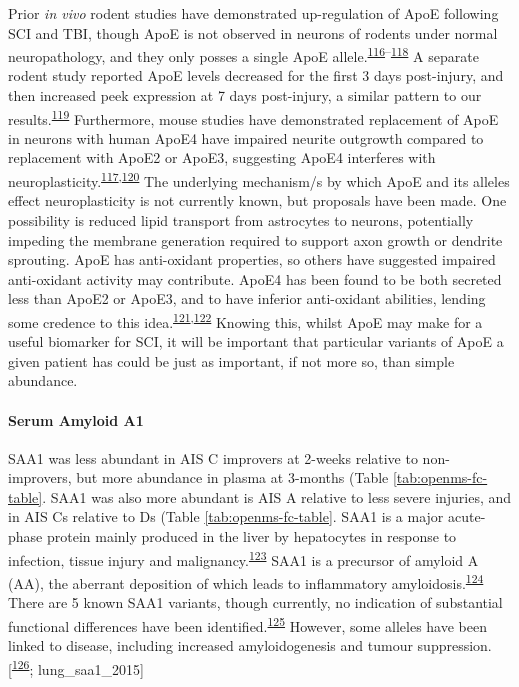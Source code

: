 \documentclass[
]{article}
\begin{document}
Prior \emph{in vivo} rodent studies have demonstrated up-regulation of ApoE following SCI and TBI, though ApoE is not observed in neurons of rodents under normal neuropathology, and they only posses a single ApoE allele.\textsuperscript{\protect\hyperlink{ref-iwata_traumatic_2005}{116}--\protect\hyperlink{ref-mahley_apolipoprotein_2006}{118}}
A separate rodent study reported ApoE levels decreased for the first 3 days post-injury, and then increased peek expression at 7 days post-injury, a similar pattern to our results.\textsuperscript{\protect\hyperlink{ref-yang_apolipoprotein_2018}{119}}
Furthermore, mouse studies have demonstrated replacement of ApoE in neurons with human ApoE4 have impaired neurite outgrowth compared to replacement with ApoE2 or ApoE3, suggesting ApoE4 interferes with neuroplasticity.\textsuperscript{\protect\hyperlink{ref-seitz_apolipoprotein_2003}{117},\protect\hyperlink{ref-white_impaired_2001}{120}}
The underlying mechanism/s by which ApoE and its alleles effect neuroplasticity is not currently known, but proposals have been made.
One possibility is reduced lipid transport from astrocytes to neurons, potentially impeding the membrane generation required to support axon growth or dendrite sprouting.
ApoE has anti-oxidant properties, so others have suggested impaired anti-oxidant activity may contribute.
ApoE4 has been found to be both secreted less than ApoE2 or ApoE3, and to have inferior anti-oxidant abilities, lending some credence to this idea.\textsuperscript{\protect\hyperlink{ref-mishra_inflammation_2018}{121},\protect\hyperlink{ref-miyata_apolipoprotein_1996}{122}}
Knowing this, whilst ApoE may make for a useful biomarker for SCI, it will be important that particular variants of ApoE a given patient has could be just as important, if not more so, than simple abundance.

\hypertarget{serum-amyloid-a1}{%
\paragraph{Serum Amyloid A1}\label{serum-amyloid-a1}}

SAA1 was less abundant in AIS C improvers at 2-weeks relative to non-improvers, but more abundance in plasma at 3-months (Table \ref{tab:openms-fc-table}.
SAA1 was also more abundant is AIS A relative to less severe injuries, and in AIS Cs relative to Ds (Table \ref{tab:openms-fc-table}.
SAA1 is a major acute-phase protein mainly produced in the liver by hepatocytes in response to infection, tissue injury and malignancy.\textsuperscript{\protect\hyperlink{ref-sun_serum_2016}{123}}
SAA1 is a precursor of amyloid A (AA), the aberrant deposition of which leads to inflammatory amyloidosis.\textsuperscript{\protect\hyperlink{ref-tape_direct_1988}{124}}
There are 5 known SAA1 variants, though currently, no indication of substantial functional differences have been identified.\textsuperscript{\protect\hyperlink{ref-lu_structural_2014}{125}}
However, some alleles have been linked to disease, including increased amyloidogenesis and tumour suppression.{[}\textsuperscript{\protect\hyperlink{ref-van_der_hilst_increased_2008}{126}}; lung\_saa1\_2015{]}
\end{document}
